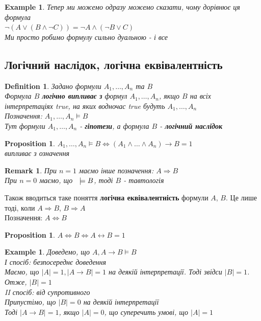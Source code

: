 \documentclass[a4paper, 14pt]{extarticle}
\theoremstyle{theoremdd}
\theoremstyle{theoremdd}
\newtheorem{definition}[theorem]{Definition}
\theoremstyle{theoremdd}
\theoremstyle{theoremdd}
\newtheorem{example}[theorem]{Example}
\theoremstyle{theoremdd}
\newtheorem{proposition}[theorem]{Proposition}
\theoremstyle{theoremdd}
\newtheorem{remark}[theorem]{Remark}
\theoremstyle{theoremdd}
\theoremstyle{theoremdd}
\begin{document}
\begin{example} Тепер ми можемо одразу можемо сказати, чому дорівнює ця формула\\
$\neg (A \vee (B \wedge \neg C)) = \neg A \wedge (\neg B \vee C)$\\
Ми просто робимо формулу сильно дуальною - і все
\end{example}

\subsection{Логічний наслідок, логічна еквівалентність}
\begin{definition}
Задано формули $A_1,\dots,A_n$ та $B$\\
Формула $B$ \textbf{логічно випливає з} формул $A_1,\dots,A_n$, якщо $B$ на всіх інтерпретаціях true, на яких водночас true будуть $A_1,\dots,A_n$\\
Позначення: $A_1,\dots,A_n \models B$\\
Тут формули $A_1,\dots,A_n$ - \textbf{гіпотези}, а формула $B$ - \textbf{логічний наслідок}
\end{definition}

\begin{proposition}
$A_1,\dots,A_n \models B \iff (A_1 \wedge \dots \wedge A_n) \rightarrow B = 1$\\
\textit{випливає з означення}
\end{proposition}

\begin{remark}
При $n = 1$ маємо інше позначення: $A \Rightarrow B$\\
При $n = 0$ маємо, що $\hspace{0.2cm} \models B$, тоді $B$ - тавтологія
\end{remark}

Також вводиться таке поняття \textbf{логічна еквівалентність} формули $A$, $B$. Це лише тоді, коли $A \Rightarrow B$, $B \Rightarrow A$\\
Позначення: $A \Leftrightarrow B$
\begin{proposition}
$A \Leftrightarrow B \iff A \leftrightarrow B = 1$
\end{proposition}

\begin{example} Доведемо, що $A, A \rightarrow B \models B$\\
І спосіб: безпосереднє доведення\\
Маємо, що $|A| = 1, |A \rightarrow B| = 1$ на деякій інтерпретації. Тоді звідси $|B| = 1$. Отже, $|B| = 1$
\bigskip \\
II спосіб: від супротивного\\
Припустімо, що $|B| = 0$ на деякій інтерпретації\\
Тоді $|A \rightarrow B| = 1$, якщо $|A| = 0$, що суперечить умові, що $|A| = 1$
\end{example}
\end{document}
